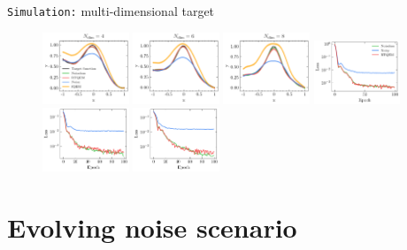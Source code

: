 \documentclass[8pt, xcolor={svgnames}, hyperref={linkcolor=black}, aspectratio=169]{beamer}
\begin{document}
\begin{frame}{\texttt{Simulation:} multi-dimensional target}
\begin{figure}
    \includegraphics[width=0.23\textwidth]{figures/cos4d.pdf}%
    \includegraphics[width=0.23\textwidth]{figures/cos6d.pdf}%
    \includegraphics[width=0.23\textwidth]{figures/cos8d.pdf}
    \includegraphics[width=0.23\textwidth]{figures/cos4d_loss.pdf}%
    \includegraphics[width=0.23\textwidth]{figures/cos6d_loss.pdf}%
    \includegraphics[width=0.23\textwidth]{figures/cos8d_loss.pdf}
\end{figure}
\end{frame}

\section{Evolving noise scenario}
\end{document}
